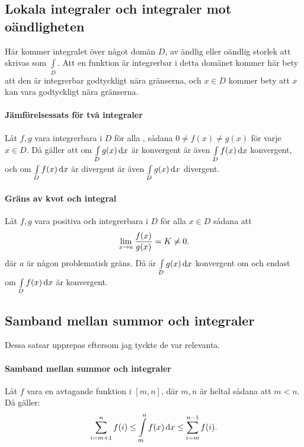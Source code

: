 \subsection{Lokala integraler och integraler mot oändligheten}

Här kommer integralet över något domän $D$, av ändlig eller oändlig storlek att skrivas som $\int\limits_{D}$. Att en funktion är integrerbar i detta domänet kommer här bety att den är integrerbar godtyckligt nära gränserna, och $x\in D$ kommer bety att $x$ kan vara godtyckligt nära gränserna.

\paragraph{Jämförelsessats för två integraler}
Låt $f, g$ vara integrerbara i $D$ för alla , sådana $0\neq f(x)\neq g(x)$ för varje $x\in D$. Då gäller att om $\int\limits_{D}^{}g(x)\dd{x}$ är konvergent är även $\int\limits_{D}^{}f(x)\dd{x}$ konvergent, och om $\int\limits_{D}^{}f(x)\dd{x}$ är divergent är även $\int\limits_{D}^{}g(x)\dd{x}$ divergent.

\paragraph{Gräns av kvot och integral}
Låt $f, g$ vara positiva och integrerbara i $D$ för alla $x\in D$ sådana att
\begin{align*}
	\lim\limits_{x\to a}\frac{f(x)}{g(x)} = K\neq 0.
\end{align*}
där $a$ är någon problematisk gräns. Då är $\int\limits_{D}^{}g(x)\dd{x}$ konvergent om och endast om $\int\limits_{D}^{}f(x)\dd{x}$ är konvergent.

\subsection{Samband mellan summor och integraler}

Dessa satsar upprepas eftersom jag tyckte de var relevanta.

\paragraph{Samband mellan summor och integraler}
Låt $f$ vara en avtagande funktion i $[m, n]$, där $m, n$ är heltal sådana att $m < n$. Då gäller:
\begin{align*}
	\sum\limits_{i = m + 1}^{n}f(i)\leq \int\limits_{m}^{n}f(x)\dd{x}\leq \sum\limits_{i = m}^{n - 1}f(i).
\end{align*}

